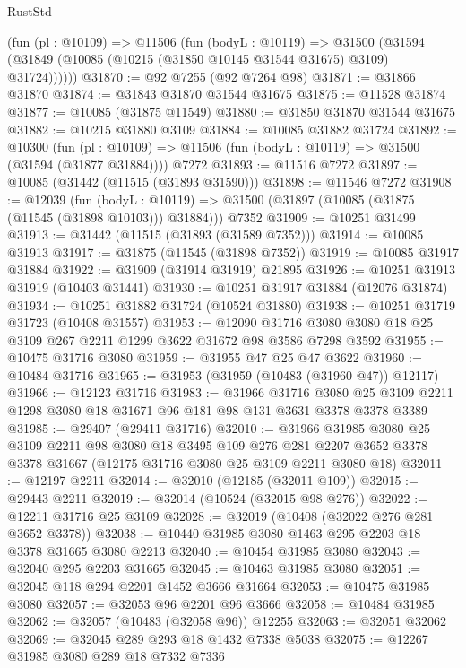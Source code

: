 \begin{lexlean}{RustStd}
\begin{coremodule}
      (fun (pl : @10109) =>
      @11506
        (fun (bodyL : @10119) =>
        @31500 (@31594 (@31849 (@10085 (@10215 (@31850 @10145 @31544 @31675) @3109) @31724))))))
@31870 := @92 @7255 (@92 @7264 @98)
@31871 := @31866 @31870
@31874 := @31843 @31870 @31544 @31675
@31875 := @11528 @31874
@31877 := @10085 (@31875 @11549)
@31880 := @31850 @31870 @31544 @31675
@31882 := @10215 @31880 @3109
@31884 := @10085 @31882 @31724
@31892 := @10300
    (fun (pl : @10109) => @11506 (fun (bodyL : @10119) => @31500 (@31594 (@31877 @31884))))
    @7272
@31893 := @11516 @7272
@31897 := @10085 (@31442 (@11515 (@31893 @31590)))
@31898 := @11546 @7272
@31908 := @12039
    (fun (bodyL : @10119) => @31500 (@31897 (@10085 (@31875 (@11545 (@31898 @10103))) @31884)))
    @7352
@31909 := @10251 @31499
@31913 := @31442 (@11515 (@31893 (@31589 @7352)))
@31914 := @10085 @31913
@31917 := @31875 (@11545 (@31898 @7352))
@31919 := @10085 @31917 @31884
@31922 := @31909 (@31914 @31919) @21895
@31926 := @10251 @31913 @31919 (@10403 @31441)
@31930 := @10251 @31917 @31884 (@12076 @31874)
@31934 := @10251 @31882 @31724 (@10524 @31880)
@31938 := @10251 @31719 @31723 (@10408 @31557)
@31953 := @12090
    @31716
    @3080
    @3080
    @18
    @25
    @3109
    @267
    @2211
    @1299
    @3622
    @31672
    @98
    @3586
    @7298
    @3592
@31955 := @10475 @31716 @3080
@31959 := @31955 @47 @25 @47 @3622
@31960 := @10484 @31716
@31965 := @31953 (@31959 (@10483 (@31960 @47)) @12117)
@31966 := @12123 @31716
@31983 := @31966
    @31716
    @3080
    @25
    @3109
    @2211
    @1298
    @3080
    @18
    @31671
    @96
    @181
    @98
    @131
    @3631
    @3378
    @3378
    @3389
@31985 := @29407 (@29411 @31716)
@32010 := @31966
    @31985
    @3080
    @25
    @3109
    @2211
    @98
    @3080
    @18
    @3495
    @109
    @276
    @281
    @2207
    @3652
    @3378
    @3378
    @31667
    (@12175 @31716 @3080 @25 @3109 @2211 @3080 @18)
@32011 := @12197 @2211
@32014 := @32010 (@12185 (@32011 @109))
@32015 := @29443 @2211
@32019 := @32014 (@10524 (@32015 @98 @276))
@32022 := @12211 @31716 @25 @3109
@32028 := @32019 (@10408 (@32022 @276 @281 @3652 @3378))
@32038 := @10440 @31985 @3080 @1463 @295 @2203 @18 @3378 @31665 @3080 @2213
@32040 := @10454 @31985 @3080
@32043 := @32040 @295 @2203 @31665
@32045 := @10463 @31985 @3080
@32051 := @32045 @118 @294 @2201 @1452 @3666 @31664
@32053 := @10475 @31985 @3080
@32057 := @32053 @96 @2201 @96 @3666
@32058 := @10484 @31985
@32062 := @32057 (@10483 (@32058 @96)) @12255
@32063 := @32051 @32062
@32069 := @32045 @289 @293 @18 @1432 @7338 @5038
@32075 := @12267 @31985 @3080 @289 @18 @7332 @7336

\end{coremodule}
\end{lexlean}
